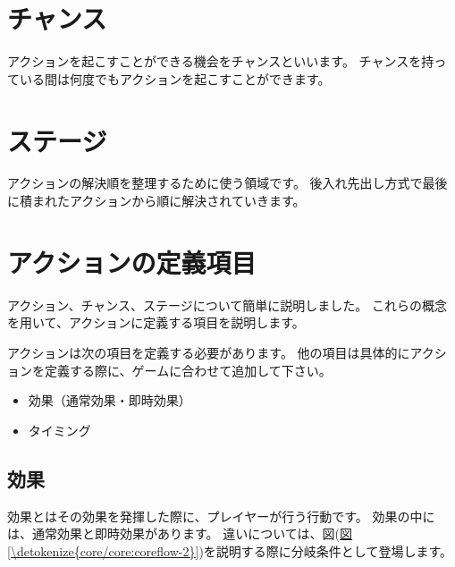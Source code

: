\documentclass[letterpaper,10pt,dvipdfmx]{sphinxmanual}
\begin{document}
\section{チャンス}
\label{\detokenize{core/core:id4}}
アクションを起こすことができる機会をチャンスといいます。
チャンスを持っている間は何度でもアクションを起こすことができます。


\section{ステージ}
\label{\detokenize{core/core:id5}}
アクションの解決順を整理するために使う領域です。
後入れ先出し方式で最後に積まれたアクションから順に解決されていきます。


\section{アクションの定義項目}
\label{\detokenize{core/core:id6}}
アクション、チャンス、ステージについて簡単に説明しました。
これらの概念を用いて、アクションに定義する項目を説明します。

アクションは次の項目を定義する必要があります。
他の項目は具体的にアクションを定義する際に、ゲームに合わせて追加して下さい。
\begin{itemize}
\item {} 
効果（通常効果・即時効果）

\item {} 
タイミング

\end{itemize}


\subsection{効果}
\label{\detokenize{core/core:id7}}
効果とはその効果を発揮した際に、プレイヤーが行う行動です。
効果の中には、通常効果と即時効果があります。
違いについては、図(\hyperref[\detokenize{core/core:coreflow-2}]{図 \ref{\detokenize{core/core:coreflow-2}}})を説明する際に分岐条件として登場します。
\end{document}

